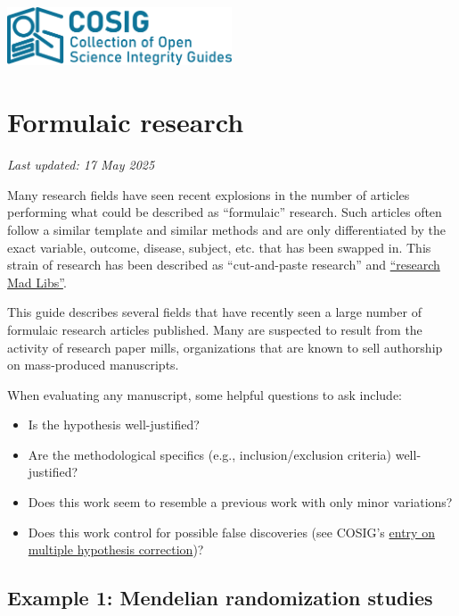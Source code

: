 \documentclass[letterpaper, 12pt]{article}
\begin{document}
\flushleft
\includegraphics[width=0.5\textwidth]{img/home/241017_final_logo_mockup.png}

\section*{Formulaic research}
\textit{Last updated: 17 May 2025}

Many research fields have seen recent explosions in the number of articles performing what could be described as ``formulaic'' research. Such articles often follow a similar template and similar methods and are only differentiated by the exact variable, outcome, disease, subject, etc. that has been swapped in. This strain of research has been described as ``cut-and-paste research'' and \href{https://doi.org/10.1126/science.zgawnij}{``research Mad Libs\textregistered''}. 

This guide describes several fields that have recently seen a large number of formulaic research articles published. Many are suspected to result from the activity of research paper mills, organizations that are known to sell authorship on mass-produced manuscripts.

When evaluating any manuscript, some helpful questions to ask include:

\begin{itemize}
    \setlength\itemsep{-0.5em}
    \item Is the hypothesis well-justified?
    \item Are the methodological specifics (e.g., inclusion/exclusion criteria) well-justified?
    \item Does this work seem to resemble a previous work with only minor variations?
    \item Does this work control for possible false discoveries (see COSIG's \href{https://osf.io/csxd5}{entry on multiple hypothesis correction})?
\end{itemize}

\subsection*{Example 1: Mendelian randomization studies}
\end{document}
